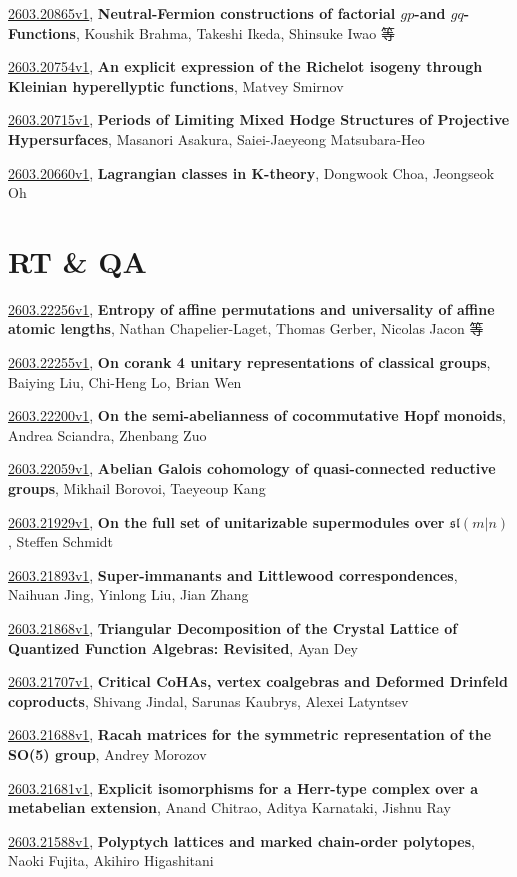 \documentclass[9pt, a4paper]{article}
\theoremstyle{plain}
\theoremstyle{definition}
\theoremstyle{remark}
\newcommand{\arxiv}[3]{\href{https://arxiv.org/abs/#1}{#1}, \textbf{\textcolor{arxivblue}{#2}}, #3}
\begin{document}
\arxiv{2603.20865v1}{Neutral-Fermion constructions of factorial $gp$-and $gq$-Functions}{Koushik Brahma, Takeshi Ikeda, Shinsuke Iwao 等}

\arxiv{2603.20754v1}{An explicit expression of the Richelot isogeny through Kleinian hyperellyptic functions}{Matvey Smirnov}

\arxiv{2603.20715v1}{Periods of Limiting Mixed Hodge Structures of Projective Hypersurfaces}{Masanori Asakura, Saiei-Jaeyeong Matsubara-Heo}

\arxiv{2603.20660v1}{Lagrangian classes in K-theory}{Dongwook Choa, Jeongseok Oh}


\section{RT \& QA}
\arxiv{2603.22256v1}{Entropy of affine permutations and universality of affine atomic lengths}{Nathan Chapelier-Laget, Thomas Gerber, Nicolas Jacon 等}

\arxiv{2603.22255v1}{On corank 4 unitary representations of classical groups}{Baiying Liu, Chi-Heng Lo, Brian Wen}

\arxiv{2603.22200v1}{On the semi-abelianness of cocommutative Hopf monoids}{Andrea Sciandra, Zhenbang Zuo}

\arxiv{2603.22059v1}{Abelian Galois cohomology of quasi-connected reductive groups}{Mikhail Borovoi, Taeyeoup Kang}

\arxiv{2603.21929v1}{On the full set of unitarizable supermodules over $\mathfrak{sl}(m\vert n)$}{Steffen Schmidt}

\arxiv{2603.21893v1}{Super-immanants and Littlewood correspondences}{Naihuan Jing, Yinlong Liu, Jian Zhang}

\arxiv{2603.21868v1}{Triangular Decomposition of the Crystal Lattice of Quantized Function Algebras: Revisited}{Ayan Dey}

\arxiv{2603.21707v1}{Critical CoHAs, vertex coalgebras and Deformed Drinfeld coproducts}{Shivang Jindal, Sarunas Kaubrys, Alexei Latyntsev}

\arxiv{2603.21688v1}{Racah matrices for the symmetric representation of the SO(5) group}{Andrey Morozov}

\arxiv{2603.21681v1}{Explicit isomorphisms for a Herr-type complex over a metabelian extension}{Anand Chitrao, Aditya Karnataki, Jishnu Ray}

\arxiv{2603.21588v1}{Polyptych lattices and marked chain-order polytopes}{Naoki Fujita, Akihiro Higashitani}
\end{document}
